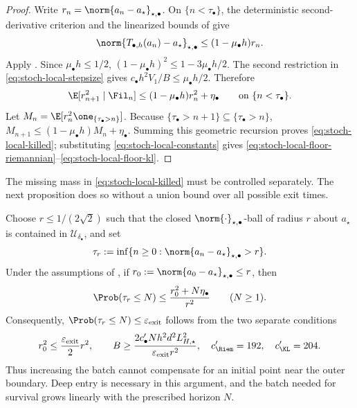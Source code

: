 \begin{proof}
Write \(r_n=\norm{a_n-a_\star}_{\star,\bullet}\).  On
\(\{n<\tau_\bullet\}\), the deterministic second-derivative criterion and
the linearized bounds of  give
\[
  \norm{T_{\bullet,h}(a_n)-a_\star}_{\star,\bullet}
  \leq(1-\mu_\bullet h)r_n.
\]
Apply .  Since
\(\mu_\bullet h\leq1/2\),
\((1-\mu_\bullet h)^2\leq1-3\mu_\bullet h/2\).  The second restriction in
\eqref{eq:stoch-local-stepsize} gives
\(c_\bullet h^2V_1/B\leq\mu_\bullet h/2\).  Therefore
\begin{equation}
  \E[r_{n+1}^2\mid\Fil_n]
  \leq(1-\mu_\bullet h)r_n^2+\eta_\bullet
  \qquad\text{on }\{n<\tau_\bullet\}.
  \label{eq:stoch-local-one-step-recursion}
\end{equation}
Let
\(M_n=\E[r_n^2\one_{\{\tau_\bullet>n\}}]\).  Because
\(\{\tau_\bullet>n+1\}\subseteq\{\tau_\bullet>n\}\),
\(M_{n+1}\leq(1-\mu_\bullet h)M_n+\eta_\bullet\).
Summing this geometric recursion proves
\eqref{eq:stoch-local-killed}; substituting
\eqref{eq:stoch-local-constants} gives
\eqref{eq:stoch-local-floor-riemannian}--\eqref{eq:stoch-local-floor-kl}.
\end{proof}

The missing mass in \eqref{eq:stoch-local-killed} must be controlled
separately.  The next proposition does so without a union bound over all
possible exit times.

\begin{proposition}
\label{prop:stoch-local-containment}
Choose \(r\leq1/(2\sqrt2)\) such that the closed
\(\norm{\cdot}_{\star,\bullet}\)-ball of radius \(r\) about \(a_\star\) is
contained in \(\mathcal U_{\delta_\bullet}\), and set
\[
  \tau_r:=\inf\{n\geq0:
    \norm{a_n-a_\star}_{\star,\bullet}>r\}.
\]
Under the assumptions of , if
\(r_0:=\norm{a_0-a_\star}_{\star,\bullet}\leq r\), then
\begin{equation}
  \Prob(\tau_r\leq N)
  \leq\frac{r_0^2+N\eta_\bullet}{r^2}
  \qquad(N\geq1).
  \label{eq:stoch-local-exit-probability}
\end{equation}
Consequently, \(\Prob(\tau_r\leq N)\leq\varepsilon_{\rm exit}\) follows
from the two separate conditions
\begin{equation}
  r_0^2\leq\frac{\varepsilon_{\rm exit}}2r^2,
  \qquad
  B\geq
  \frac{2c'_\bullet Nh^2d^2L_{H,\star}^2}
       {\varepsilon_{\rm exit}r^2},
  \quad
  c'_{\Riem}=192,
  \quad c'_{\KL}=204.
  \label{eq:stoch-local-containment-conditions}
\end{equation}
Thus increasing the batch cannot compensate for an initial point near the
outer boundary.  Deep entry is necessary in this argument, and the batch
needed for survival grows linearly with the prescribed horizon \(N\).
\end{proposition}

